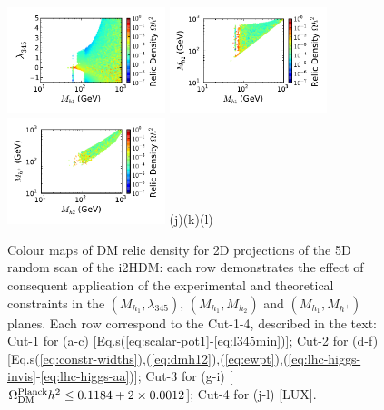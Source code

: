 \begin{figure}[htb]
\vskip 0.0cm
{\hspace*{-0.3cm}\includegraphics[width=0.41\textwidth]{Figures/Mh1_ld345_Omega_large-cut12345678.pdf}}%
{\hspace*{-1.78cm}\includegraphics[width=0.41\textwidth]{Figures/Mh1_Mh2_Omega_large-cut12345678.pdf}}%
{\hspace*{-1.77cm}\includegraphics[width=0.41\textwidth]{Figures/Mhc_Mh2_Omega_large-cut12345678.pdf}}%
\vskip -1.05cm
\hspace*{1.2cm}(j)\hspace*{0.35\textwidth}\hspace*{-1.3cm}(k)\hspace*{0.35\textwidth}\hspace*{-1.2cm}(l)
\caption{Colour maps of DM relic density for 2D projections of the 5D random scan of the i2HDM:  
each row demonstrates the effect of consequent application
of the experimental and theoretical constraints in the $(M_{h_1},\lambda_{345})$, $(M_{h_1},M_{h_2})$ and 
$(M_{h_1},M_{h^{+}})$ planes. Each row correspond to the Cut-1-4, described in the text: Cut-1 for (a-c) [Eq.s(\ref{eq:scalar-pot1}-\ref{eq:l345min})]; Cut-2 for (d-f) [Eq.s(\ref{eq:constr-widths}),(\ref{eq:dmh12}),(\ref{eq:ewpt}),(\ref{eq:lhc-higgs-invis}-\ref{eq:lhc-higgs-aa})]; Cut-3 for (g-i) [$\Omega_{\rm DM}^{\rm Planck} h^2 \le 0.1184+2\times 0.0012$]; Cut-4 for (j-l) [LUX].
%
\label{fig:dm-i2hdm}} 
\end{figure}

